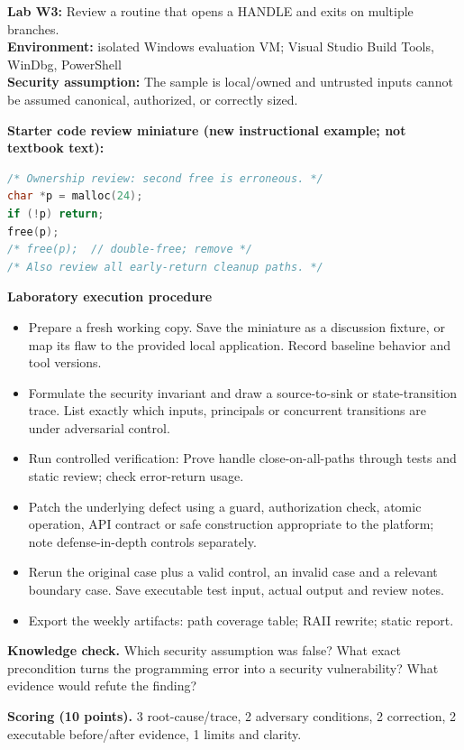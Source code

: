 \documentclass[10pt,letterpaper]{article}
\begin{document}
\begin{insight}\textbf{Lab W3:} Review a routine that opens a HANDLE and exits on multiple branches.\\\textbf{Environment:} isolated Windows evaluation VM; Visual Studio Build Tools, WinDbg, PowerShell\\\textbf{Security assumption:} The sample is local/owned and untrusted inputs cannot be assumed canonical, authorized, or correctly sized.\end{insight}
\textbf{Starter code review miniature (new instructional example; not textbook text):}
\begin{lstlisting}[language=C]
/* Ownership review: second free is erroneous. */
char *p = malloc(24);
if (!p) return;
free(p);
/* free(p);  // double-free; remove */
/* Also review all early-return cleanup paths. */
\end{lstlisting}
\textbf{Laboratory execution procedure}
\begin{itemize}[leftmargin=*,itemsep=2pt]
\item Prepare a fresh working copy. Save the miniature as a discussion fixture, or map its flaw to the provided local application. Record baseline behavior and tool versions.
\item Formulate the security invariant and draw a source-to-sink or state-transition trace. List exactly which inputs, principals or concurrent transitions are under adversarial control.
\item Run controlled verification: Prove handle close-on-all-paths through tests and static review; check error-return usage.
\item Patch the underlying defect using a guard, authorization check, atomic operation, API contract or safe construction appropriate to the platform; note defense-in-depth controls separately.
\item Rerun the original case plus a valid control, an invalid case and a relevant boundary case. Save executable test input, actual output and review notes.
\item Export the weekly artifacts: path coverage table; RAII rewrite; static report.
\end{itemize}
\textbf{Knowledge check.} Which security assumption was false? What exact precondition turns the programming error into a security vulnerability? What evidence would refute the finding?

\textbf{Scoring (10 points).} 3 root-cause/trace, 2 adversary conditions, 2 correction, 2 executable before/after evidence, 1 limits and clarity.
\end{document}
